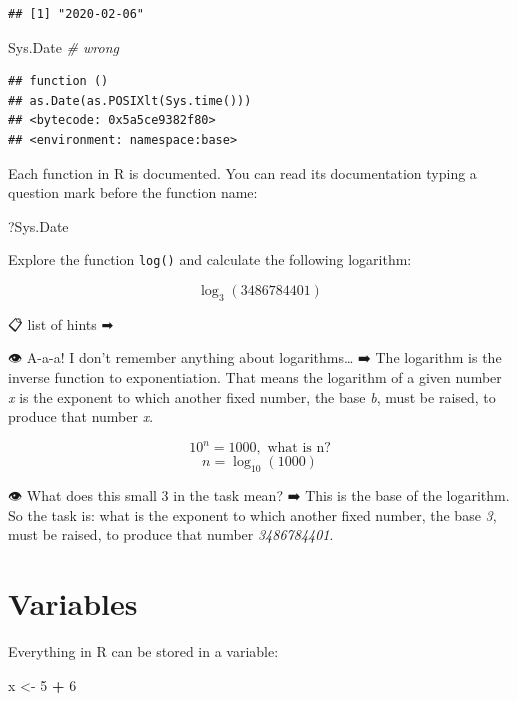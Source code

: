 \documentclass[
]{book}
\makeatletter
\newenvironment{Shaded}{\begin{snugshade}}{\end{snugshade}}
\newcommand{\CommentTok}[1]{\textcolor[rgb]{0.56,0.35,0.01}{\textit{#1}}}
\newcommand{\DecValTok}[1]{\textcolor[rgb]{0.00,0.00,0.81}{#1}}
\newcommand{\NormalTok}[1]{#1}
\newcommand{\OperatorTok}[1]{\textcolor[rgb]{0.81,0.36,0.00}{\textbf{#1}}}
\newcommand{\StringTok}[1]{\textcolor[rgb]{0.31,0.60,0.02}{#1}}
\newenvironment{kframe}{%
\medskip{}
\setlength{\fboxsep}{.8em}
 \def\at@end@of@kframe{}%
 \ifinner\ifhmode%
  \def\at@end@of@kframe{\end{minipage}}%
  \begin{minipage}{\columnwidth}%
 \fi\fi%
 \def\FrameCommand##1{\hskip\@totalleftmargin \hskip-\fboxsep
 \colorbox{shadecolor}{##1}\hskip-\fboxsep
     \hskip-\linewidth \hskip-\@totalleftmargin \hskip\columnwidth}%
 \MakeFramed {\advance\hsize-\width
   \@totalleftmargin\z@ \linewidth\hsize
   \@setminipage}}%
 {\par\unskip\endMakeFramed%
 \at@end@of@kframe}
\newenvironment{rmdblock}[1]
  {
  \begin{itemize}
  \renewcommand{\labelitemi}{
    \raisebox{-.7\height}[0pt][0pt]{
      {\setkeys{Gin}{width=3em,keepaspectratio}\texttt{[image: images/\#1]}}
    }
  }
  \setlength{\fboxsep}{1em}
  \begin{kframe}
  \item
  }
  {
  \end{kframe}
  \end{itemize}
  }
\newenvironment{rmdtask}
  {\begin{rmdblock}{task}}
  {\end{rmdblock}}
\makeatother
\begin{document}
\begin{verbatim}
## [1] "2020-02-06"
\end{verbatim}

\begin{Shaded}
\begin{Highlighting}[]
\NormalTok{Sys.Date }\CommentTok{# wrong}
\end{Highlighting}
\end{Shaded}

\begin{verbatim}
## function () 
## as.Date(as.POSIXlt(Sys.time()))
## <bytecode: 0x5a5ce9382f80>
## <environment: namespace:base>
\end{verbatim}

Each function in R is documented. You can read its documentation typing a question mark before the function name:

\begin{Shaded}
\begin{Highlighting}[]
\NormalTok{?Sys.Date}
\end{Highlighting}
\end{Shaded}

\begin{rmdtask}
Explore the function \texttt{log()} and calculate the following
logarithm:
\end{rmdtask}

\[\log_3(3486784401)\]

📋 list of hints ➡

👁 A-a-a! I don't remember anything about logarithms\ldots{} ➡
The logarithm is the inverse function to exponentiation. That means the logarithm of a given number \emph{x} is the exponent to which another fixed number, the base \emph{b}, must be raised, to produce that number \emph{x}.

\[10^n = 1000,\text{ what is n?}\]
\[n = \log_{10}(1000)\]

👁 What does this small 3 in the task mean? ➡
This is the base of the logarithm. So the task is: what is the exponent to which another fixed number, the base \emph{3}, must be raised, to produce that number \emph{3486784401}.

\hypertarget{variables}{%
\section{Variables}\label{variables}}

Everything in R can be stored in a variable:

\begin{Shaded}
\begin{Highlighting}[]
\NormalTok{x <-}\StringTok{ }\DecValTok{5} \OperatorTok{+}\StringTok{ }\DecValTok{6}
\end{Highlighting}
\end{Shaded}
\end{document}
